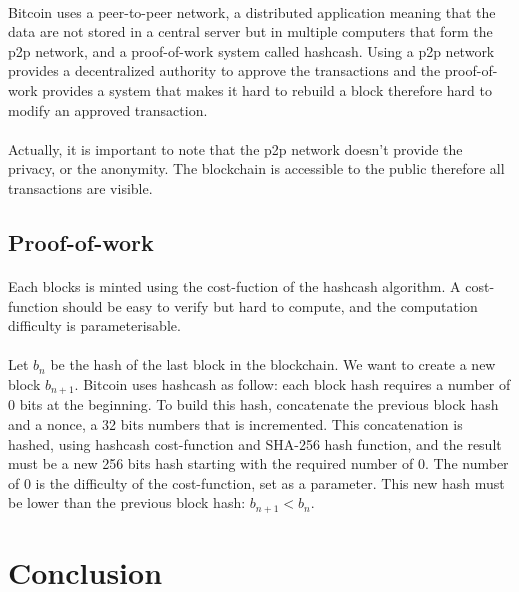 \documentclass[letterpaper]{article}
\begin{document}
\paragraph{}
Bitcoin uses a peer-to-peer network,
a distributed application meaning that the data are not stored in a
central server but in multiple computers that form the p2p network,
and a proof-of-work system called hashcash\cite{hashcash}. Using a p2p network
provides a decentralized authority to approve the transactions and
the proof-of-work provides a system that makes it hard to rebuild
a block therefore hard to modify an approved transaction.

\paragraph{}
Actually, it is important to note that the p2p network doesn't provide
the privacy, or the anonymity. The blockchain is accessible to the public
therefore all transactions are visible.

\subsection{Proof-of-work}
\label{proof}
\paragraph{}
Each blocks is minted using the cost-fuction of the hashcash
algorithm.
A cost-function should be easy to verify but hard to compute, and the
computation difficulty is parameterisable\cite{hashcash}.
\paragraph{}
Let $b_n$ be the hash
of the last block in the blockchain.
We want to create a new block $b_{n+1}$. Bitcoin uses hashcash as follow:
each block hash requires a number of 0 bits at the beginning. To build this
hash, concatenate the previous block hash and a nonce, a 32 bits numbers
that is incremented. This concatenation is hashed, using hashcash cost-function
 and SHA-256 hash function,
and the result
must be a new 256 bits hash starting with the required number of 0.
The number of 0 is the difficulty of the cost-function, set as a parameter.
This new hash must be lower than the previous block hash: $b_{n+1} < b_n$.

\section*{Conclusion}





\end{document}
